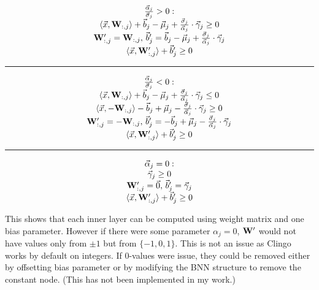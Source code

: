 \documentclass[
    digital,
    color,
    oneside,
    sansbold,
    lot,
    nolof
]{fithesis}
\begin{document}
\begin{equation*}
    \begin{matrix}
        \frac{\vec\alpha_j}{\vec\sigma_j} > 0: \\
        \langle \vec x, \mathbf{W}_{:, j}\rangle + \vec b_j - \vec \mu_j + \frac{\vec \sigma_j}{\vec\alpha_j}\cdot \vec \gamma_j \geq 0\\
        \mathbf{W}'_{:, j} = \mathbf{W}_{:, j}, \,
        \vec b'_j = \vec b_j - \vec\mu_j + \frac{\vec\sigma_j}{\vec\alpha_j}\cdot \vec\gamma_j\\
        \langle \vec x, \mathbf{W}'_{:, j}\rangle + \vec b'_j \geq 0\\
    \end{matrix}
\end{equation*}
\hfill\rule{0.7\textwidth}{0.4pt}\hfill\phantom{}
\begin{equation*}
    \begin{matrix}
        \frac{\vec\alpha_j}{\vec\sigma_j} < 0: \\
        \langle \vec x, \mathbf{W}_{:, j}\rangle + \vec b_j - \vec \mu_j + \frac{\vec \sigma_j}{\vec\alpha_j}\cdot \vec \gamma_j \leq 0 \\
        \langle \vec x, -\mathbf{W}_{:, j}\rangle - \vec b_j + \vec \mu_j - \frac{\vec \sigma_j}{\vec\alpha_j}\cdot \vec \gamma_j \geq 0\\
        \mathbf{W}'_{:, j} = -\mathbf{W}_{:, j}, \,
        \vec b'_j = -\vec b_j + \vec\mu_j - \frac{\vec\sigma_j}{\vec\alpha_j}\cdot \vec\gamma_j\\
        \langle \vec x, \mathbf{W}'_{:, j}\rangle + \vec b'_j \geq 0\\
    \end{matrix}
\end{equation*}
\hfill\rule{0.7\textwidth}{0.4pt}\hfill\phantom{}
\begin{equation*}
    \begin{matrix}
        \vec\alpha_j = 0: \\
        \vec\gamma_j \geq 0\\
        \mathbf{W}'_{:, j} = \vec 0, \,
        \vec b'_j = \vec\gamma_j\\
        \langle \vec x, \mathbf{W}'_{:, j}\rangle + \vec b'_j \geq 0\\
    \end{matrix}
\end{equation*}

This shows that each inner layer can be computed using weight matrix and
one bias parameter. However if there were some parameter $\alpha_j = 0$,
$\mathbf{W}'$ would not have values only from $\pm 1$ but from $\{-1, 0, 1\}$.
This is not an issue as Clingo works by default on integers.
If 0-values were issue, they could be removed either by offsetting bias
parameter or by modifying the BNN structure to remove the constant node.
(This has not been implemented in my work.)
\end{document}
